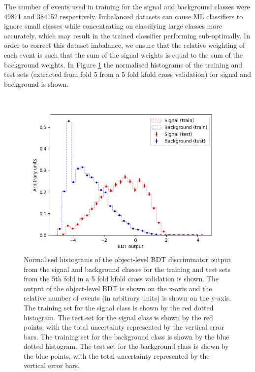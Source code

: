 The number of events used in training for the signal and background classes were 49871 and 384152 respectively. Imbalanced datasets can cause ML classifiers to ignore small classes while concentrating on classifying large classes more accurately, which may result in the trained classifier performing sub-optimally. In order to correct this dataset imbalance, we ensure that the relative weighting of each event is such that the sum of the signal weights is equal to the sum of the background weights.
In Figure \ref{fig:object-bdt-overtrain-check} the normalised histograms of the training and test sets (extracted from fold 5 from a 5 fold kfold cross validation) for signal and background is shown.


\begin{figure}[h!]
	\includegraphics[scale=0.6]{figures/overtrainingCheck_4lep_lb.png}
	\centering
	\caption{Normalised histograms of the object-level BDT discriminator output from the signal and background classes for the training and test sets from the 5th fold in a 5 fold kfold cross validation is shown. The output of the object-level BDT is shown on the x-axis and the relative number of events (in arbitrary units) is shown on the y-axis. The training set for the signal class is shown by the red dotted histogram. The test set for the signal class is shown by the red points, with the total uncertainty represented by the vertical error bars. The training set for the background class is shown by the blue dotted histogram. The test set for the background class is shown by the blue points, with the total uncertainty represented by the vertical error bars.}
	\label{fig:object-bdt-overtrain-check}
\end{figure}

